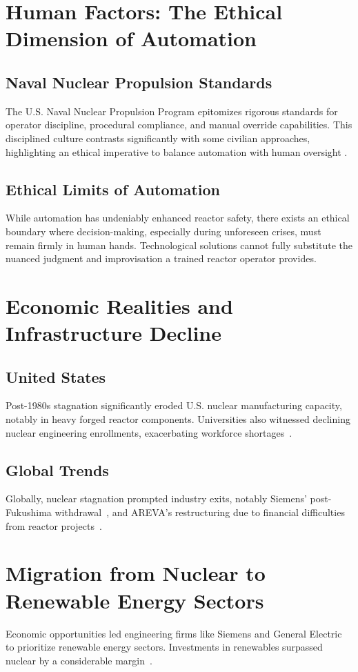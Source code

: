 \documentclass[12pt]{article}
\begin{document}
\section{Human Factors: The Ethical Dimension of Automation}

\subsection{Naval Nuclear Propulsion Standards}
The U.S. Naval Nuclear Propulsion Program epitomizes rigorous standards for operator discipline, procedural compliance, and manual override capabilities. This disciplined culture contrasts significantly with some civilian approaches, highlighting an ethical imperative to balance automation with human oversight \cite{meshkati1991human}.

\subsection{Ethical Limits of Automation}
While automation has undeniably enhanced reactor safety, there exists an ethical boundary where decision-making, especially during unforeseen crises, must remain firmly in human hands. Technological solutions cannot fully substitute the nuanced judgment and improvisation a trained reactor operator provides.

\section{Economic Realities and Infrastructure Decline}
\subsection{United States}
Post-1980s stagnation significantly eroded U.S. nuclear manufacturing capacity, notably in heavy forged reactor components. Universities also witnessed declining nuclear engineering enrollments, exacerbating workforce shortages~\cite{OECD2020}.

\subsection{Global Trends}
Globally, nuclear stagnation prompted industry exits, notably Siemens' post-Fukushima withdrawal~\cite{Reuters2011}, and AREVA's restructuring due to financial difficulties from reactor projects~\cite{WNISR2022}.

\section{Migration from Nuclear to Renewable Energy Sectors}
Economic opportunities led engineering firms like Siemens and General Electric to prioritize renewable energy sectors. Investments in renewables surpassed nuclear by a considerable margin~\cite{WNISR2022,IEA2020}.
\end{document}
